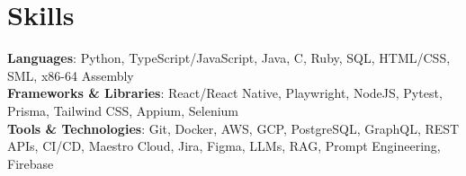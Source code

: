 \documentclass[letterpaper,11pt]{article}
\begin{document}
\section{Skills}
 \begin{itemize}[leftmargin=0.15in, label={}]
    \small{\item{
      \textbf{Languages}{: Python, TypeScript/JavaScript, Java, C, Ruby, SQL, HTML/CSS, SML, x86-64 Assembly} \\
      \vspace{1mm}
      \textbf{Frameworks \& Libraries}{: React/React Native, Playwright, NodeJS, Pytest, Prisma, Tailwind CSS, Appium, Selenium} \\
      \vspace{1mm}
      \textbf{Tools \& Technologies}{: Git, Docker, AWS, GCP, PostgreSQL, GraphQL, REST APIs, CI/CD, Maestro Cloud, Jira, Figma, LLMs, RAG, Prompt Engineering, Firebase}
    }}
 \end{itemize}
\end{document}
